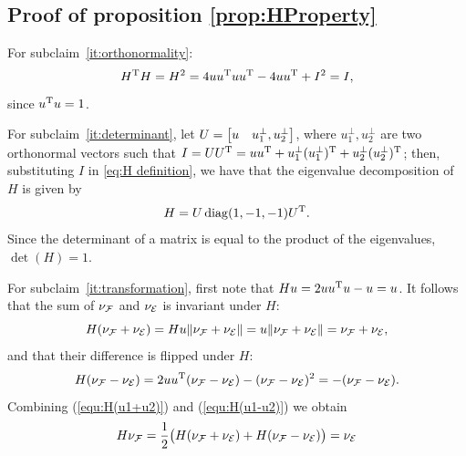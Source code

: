 \documentclass[10pt,twocolumn,twoside]{IEEEtran}
\begin{document}

\appendix
\subsection{Proof of proposition \ref{prop:HProperty}} \label{proof:HProperty}
    For subclaim~\ref{it:orthonormality}:
    \begin{equation}
      H^\mathrm{T} H=H^2=4uu^\mathrm{T} u u^\mathrm{T} - 4uu^\mathrm{T} +I^2=I,
    \end{equation}
    since $u^\mathrm{T} u=1$.

    For subclaim~\ref{it:determinant}, let $U=\begin{bmatrix}u & u^\bot_{1},u^\bot_{2}\end{bmatrix}$, where $u^\bot_{1},u^\bot_{2}$ are two orthonormal vectors such that $I=UU^\mathrm{T}=uu^\mathrm{T} + u^\bot_{1}(u^\bot_{1})^\mathrm{T}+u^\bot_{2}(u^\bot_{2})^\mathrm{T}$; then, substituting $I$ in \eqref{eq:H definition}, we have that the eigenvalue decomposition of $H$ is given by
    \begin{equation}
      H=U\operatorname{diag}(1,-1,-1) U^\mathrm{T}.
    \end{equation}
    Since the determinant of a matrix is equal to the product of the eigenvalues, $\det(H)=1$.

    For subclaim~\ref{it:transformation}, first note that $Hu=2uu^\mathrm{T} u - u=u$.
    It follows that the sum of $\nu_{\mathcal{F}}$ and $\nu_{\mathcal{E}}$ is invariant under $H$:
    \begin{equation}\label{equ:H(u1+u2)}
      H(\nu_{\mathcal{F}}+\nu_{\mathcal{E}})=H u \lVert\nu_{\mathcal{F}}+\nu_{\mathcal{E}}\rVert
      = u\lVert\nu_{\mathcal{F}}+\nu_{\mathcal{E}}\rVert =\nu_{\mathcal{F}}+\nu_{\mathcal{E}},
    \end{equation}
    and that their difference is flipped under $H$:
    \begin{equation}\label{equ:H(u1-u2)}
      H(\nu_{\mathcal{F}}-\nu_{\mathcal{E}}) = 2uu^\mathrm{T} (\nu_{\mathcal{F}}-\nu_{\mathcal{E}}) - (\nu_{\mathcal{F}}-\nu_{\mathcal{E}})^2 = -(\nu_{\mathcal{F}}-\nu_{\mathcal{E}}).
    \end{equation}
    Combining (\ref{equ:H(u1+u2)}) and (\ref{equ:H(u1-u2)}) we obtain
    \begin{equation}
      H\nu_{\mathcal{F}} = \frac{1}{2}\bigl(H(\nu_{\mathcal{F}}+\nu_{\mathcal{E}})+H(\nu_{\mathcal{F}}-\nu_{\mathcal{E}})\bigr)
      = \nu_{\mathcal{E}}
    \end{equation}
\end{document}
